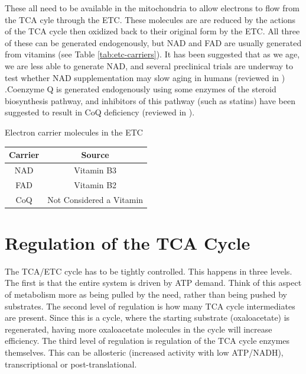 \documentclass{tufte-handout}
\begin{document}
 These all need to be available in the mitochondria to allow electrons to flow from the TCA cyle through the ETC.  These molecules are are reduced by the actions of the TCA cycle then oxidized back to their original form by the ETC.  All three of these can be generated endogenously, but NAD and FAD are usually generated from vitamins (see Table \ref{tab:etc-carriers}).  It has been suggested that as we age, we are less able to generate NAD, and several preclinical trials are underway to test whether NAD supplementation may slow aging in humans (reviewed in \citet{Rajman2018})  .Coenzyme Q is generated endogenously using some enzymes of the steroid biosynthesis pathway, and inhibitors of this pathway (such as statins) have been suggested to result in CoQ deficiency (reviewed in \citet{Quinzii2007}).  

\begin{margintable}
\centering
\caption{Electron carrier molecules in the ETC}
\label{tab:etc-carriers}
\begin{tabular}{cc}
\hline
\textbf {Carrier} & \textbf{Source}\\
\hline
NAD & Vitamin B3 \\
FAD & Vitamin B2  \\
CoQ & Not Considered a Vitamin \\
\hline
\end{tabular}
\end{margintable}


\section{Regulation of the TCA Cycle}

The TCA/ETC cycle has to be tightly controlled.  This happens in three levels.  The first is that the entire system is driven by ATP demand.  Think of this aspect of metabolism more as being pulled by the need, rather than being pushed by substrates.  The second level of regulation is how many TCA cycle intermediates are present.  Since this is a cycle, where the starting substrate (oxaloacetate) is regenerated, having more oxaloacetate molecules in the cycle will increase efficiency.  The third level of regulation is regulation of the TCA cycle enzymes themselves.  This can be allosteric (increased activity with low ATP/NADH), transcriptional or post-translational.
\end{document}
